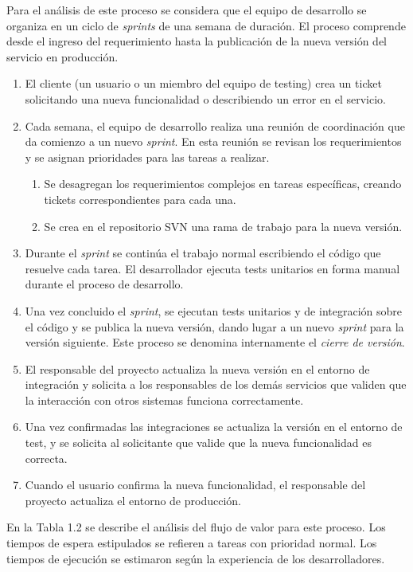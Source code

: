 Para el análisis de este proceso se considera que el equipo de desarrollo se organiza en un ciclo de \textit{sprints} de una semana de duración. El proceso comprende desde el ingreso del requerimiento hasta la publicación de la nueva versión del servicio en producción.

\begin{enumerate}
\item El cliente (un usuario o un miembro del equipo de testing) crea un ticket solicitando una nueva funcionalidad o describiendo un error en el servicio.
\item Cada semana, el equipo de desarrollo realiza una reunión de coordinación que da comienzo a un nuevo \textit{sprint}. En esta reunión se revisan los requerimientos y se asignan prioridades para las tareas a realizar.
\begin{enumerate}
\item Se desagregan los requerimientos complejos en tareas específicas, creando tickets correspondientes para cada una.
\item Se crea en el repositorio SVN una rama de trabajo para la nueva versión.
\end{enumerate}
\item Durante el \textit{sprint} se continúa el trabajo normal escribiendo el código que resuelve cada tarea. El desarrollador ejecuta tests unitarios en forma manual durante el proceso de desarrollo.
\item Una vez concluido el \textit{sprint},  se ejecutan tests unitarios y de integración sobre el código y se publica la nueva versión, dando lugar a un nuevo \textit{sprint} para la versión siguiente. Este proceso se denomina internamente el \textit{cierre de versión}.
\item El responsable del proyecto actualiza la nueva versión en el entorno de integración y solicita a los responsables de los demás servicios que validen que la interacción con otros sistemas funciona correctamente.
\item Una vez confirmadas las integraciones se actualiza la versión en el entorno de test, y se solicita al solicitante que valide que la nueva funcionalidad es correcta.
\item Cuando el usuario confirma la nueva funcionalidad, el responsable del proyecto actualiza el entorno de producción.
\end{enumerate}
En la Tabla 1.2 se describe el análisis del flujo de valor para este proceso. Los tiempos de espera estipulados se refieren a tareas con prioridad normal. Los tiempos de ejecución se estimaron según la experiencia de los desarrolladores.

